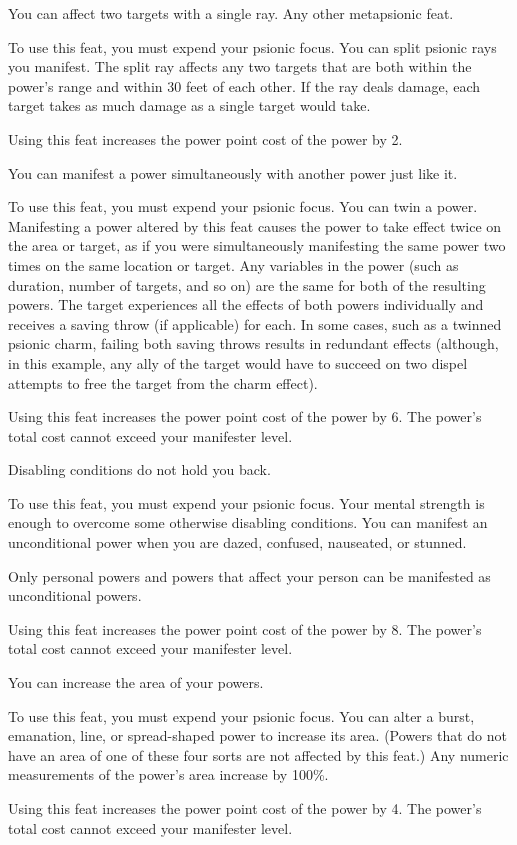 {You can affect two targets with a single ray.}
{Any other metapsionic feat.}
{To use this feat, you must expend your psionic focus. You can split psionic rays you manifest. The split ray affects any two targets that are both within the power's range and within 30 feet of each other. If the ray deals damage, each target takes as much damage as a single target would take.

Using this feat increases the power point cost of the power by 2.}{}{}

{You can manifest a power simultaneously with another power just like it.}
{}
{To use this feat, you must expend your psionic focus. You can twin a power. Manifesting a power altered by this feat causes the power to take effect twice on the area or target, as if you were simultaneously manifesting the same power two times on the same location or target. Any variables in the power (such as duration, number of targets, and so on) are the same for both of the resulting powers. The target experiences all the effects of both powers individually and receives a saving throw (if applicable) for each. In some cases, such as a twinned psionic charm, failing both saving throws results in redundant effects (although, in this example, any ally of the target would have to succeed on two dispel attempts to free the target from the charm effect).

Using this feat increases the power point cost of the power by 6. The power's total cost cannot exceed your manifester level.}{}{}

{Disabling conditions do not hold you back.}
{}
{To use this feat, you must expend your psionic focus. Your mental strength is enough to overcome some otherwise disabling conditions. You can manifest an unconditional power when you are dazed, confused, nauseated, or stunned.

Only personal powers and powers that affect your person can be manifested as unconditional powers.

Using this feat increases the power point cost of the power by 8. The power's total cost cannot exceed your manifester level.}{}{}

{You can increase the area of your powers.}
{}
{To use this feat, you must expend your psionic focus. You can alter a burst, emanation, line, or spread-shaped power to increase its area. (Powers that do not have an area of one of these four sorts are not affected by this feat.) Any numeric measurements of the power's area increase by 100\%.

Using this feat increases the power point cost of the power by 4. The power's total cost cannot exceed your manifester level.}{}{}